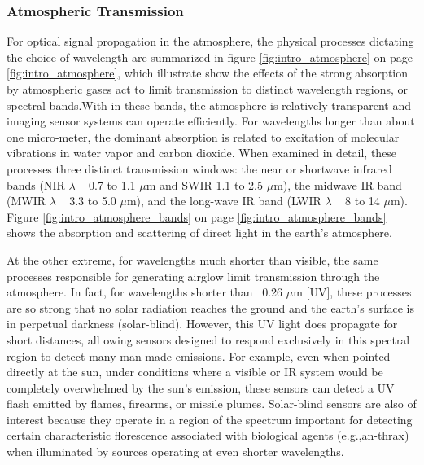 \subsubsection{Atmospheric Transmission}
\label{introAtmospheric}
For optical signal propagation in the atmosphere, the physical processes dictating the choice of wavelength are summarized in figure \ref{fig:intro_atmosphere} on page \ref{fig:intro_atmosphere}, which illustrate show the effects of the strong absorption by atmospheric gases act to limit transmission to distinct wavelength regions, or spectral bands.With in these bands, the atmosphere is relatively transparent and imaging sensor systems can operate efficiently. For wavelengths longer than about one micro-meter, the dominant absorption is related to excitation of molecular vibrations in water vapor and carbon dioxide. When examined in detail, these processes three distinct transmission windows: the near or shortwave infrared bands (\acs{NIR} $\lambda$ ~ 0.7 to 1.1 $\mu$m and \acs{SWIR} 1.1 to 2.5 $\mu$m), the midwave IR band (\acs{MWIR} $\lambda$ ~ 3.3 to 5.0 $\mu$m), and the long-wave IR band (\acs{LWIR} $\lambda$ ~ 8 to 14 $\mu$m). Figure \ref{fig:intro_atmosphere_bands} on page \ref{fig:intro_atmosphere_bands} shows the absorption and scattering of direct light in the earth's atmosphere.

At the other extreme, for wavelengths much shorter than visible, the same processes responsible for generating airglow limit transmission through the atmosphere. In fact, for wavelengths shorter than ~0.26 $\mu$m [\ac{UV}], these processes are so strong that no solar radiation reaches the ground and the earth's surface is in perpetual darkness (solar-blind). However, this \acs{UV} light does propagate for short distances, all owing sensors designed to respond exclusively in this spectral region to detect many man-made emissions. For example, even when pointed directly at the sun, under conditions where a visible or \ac{IR} system would be completely overwhelmed by the sun's emission, these sensors can detect a UV flash emitted by flames, firearms, or missile plumes. Solar-blind sensors are also of interest because they operate in a region of the spectrum important for detecting certain characteristic florescence associated with biological agents (e.g.,an-thrax) when illuminated by sources operating at even shorter wavelengths. 


